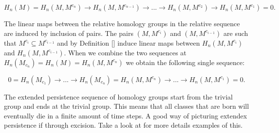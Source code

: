 $$ H_n(M) = H_n(M, M^{c_n}) \rightarrow H_n(M, M^{c_{n-1}}) \rightarrow... \rightarrow H_n(M, M^{c_{2}}) \rightarrow H_n(M, M^{c_{1}}) = 0.$$

The linear maps between the relative homology groups in the relative sequence are induced by inclusion of pairs. The pairs $(M, M^{c_i})$ and $(M, M^{c_{i-1}})$ are such that $M^{c_i} \subseteq M^{c_{i-1}}$ and by Definition [] induce linear maps between $H_n(M, M^{c_i})$ and $H_n(M, M^{c_{i-1}})$. When we combine the two sequences at $H_n(M_{c_n}) =  H_n(M) = H_n(M, M^{c_n})$ we obtain the following single sequence:

$$ 0 = H_n(M_{c_1}) \rightarrow ... \rightarrow H_n(M_{c_n}) = H_n(M, M^{c_n}) \rightarrow ... \rightarrow H_n(M, M^{c_{1}}) = 0.$$

The extended persistence sequence of homology groups start from the trivial group and ends at the trivial group. This means that all classes that are born will eventually die in a finite amount of time steps. A good way of picturing extendex persistence if through excision. Take a look at \cite{folded-molecules} for more details examples of this.







